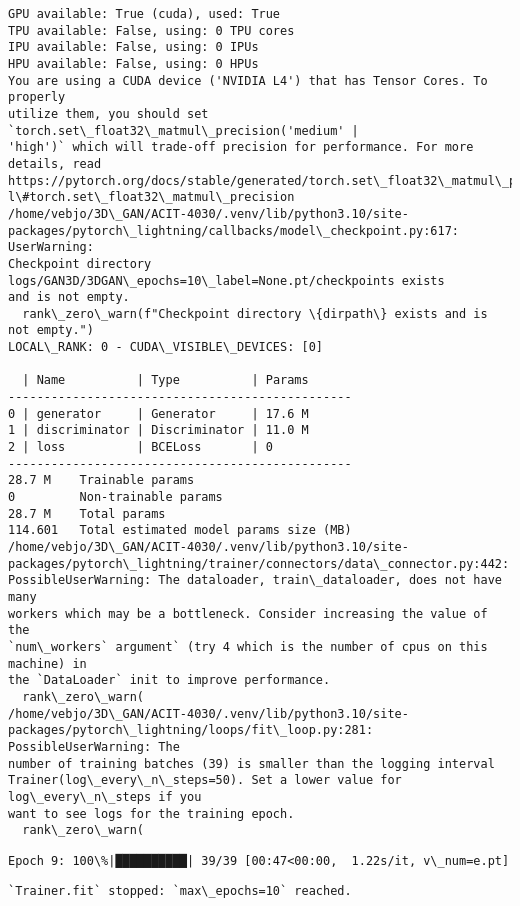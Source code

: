 \documentclass[11pt]{article}
\begin{document}
    \begin{Verbatim}[commandchars=\\\{\}]
GPU available: True (cuda), used: True
TPU available: False, using: 0 TPU cores
IPU available: False, using: 0 IPUs
HPU available: False, using: 0 HPUs
You are using a CUDA device ('NVIDIA L4') that has Tensor Cores. To properly
utilize them, you should set `torch.set\_float32\_matmul\_precision('medium' |
'high')` which will trade-off precision for performance. For more details, read 
https://pytorch.org/docs/stable/generated/torch.set\_float32\_matmul\_precision.htm
l\#torch.set\_float32\_matmul\_precision
/home/vebjo/3D\_GAN/ACIT-4030/.venv/lib/python3.10/site-
packages/pytorch\_lightning/callbacks/model\_checkpoint.py:617: UserWarning:
Checkpoint directory logs/GAN3D/3DGAN\_epochs=10\_label=None.pt/checkpoints exists
and is not empty.
  rank\_zero\_warn(f"Checkpoint directory \{dirpath\} exists and is not empty.")
LOCAL\_RANK: 0 - CUDA\_VISIBLE\_DEVICES: [0]

  | Name          | Type          | Params
------------------------------------------------
0 | generator     | Generator     | 17.6 M
1 | discriminator | Discriminator | 11.0 M
2 | loss          | BCELoss       | 0
------------------------------------------------
28.7 M    Trainable params
0         Non-trainable params
28.7 M    Total params
114.601   Total estimated model params size (MB)
/home/vebjo/3D\_GAN/ACIT-4030/.venv/lib/python3.10/site-
packages/pytorch\_lightning/trainer/connectors/data\_connector.py:442:
PossibleUserWarning: The dataloader, train\_dataloader, does not have many
workers which may be a bottleneck. Consider increasing the value of the
`num\_workers` argument` (try 4 which is the number of cpus on this machine) in
the `DataLoader` init to improve performance.
  rank\_zero\_warn(
/home/vebjo/3D\_GAN/ACIT-4030/.venv/lib/python3.10/site-
packages/pytorch\_lightning/loops/fit\_loop.py:281: PossibleUserWarning: The
number of training batches (39) is smaller than the logging interval
Trainer(log\_every\_n\_steps=50). Set a lower value for log\_every\_n\_steps if you
want to see logs for the training epoch.
  rank\_zero\_warn(
    \end{Verbatim}

    \begin{Verbatim}[commandchars=\\\{\}]
Epoch 9: 100\%|██████████| 39/39 [00:47<00:00,  1.22s/it, v\_num=e.pt]
    \end{Verbatim}

    \begin{Verbatim}[commandchars=\\\{\}]
`Trainer.fit` stopped: `max\_epochs=10` reached.
    \end{Verbatim}
\end{document}
